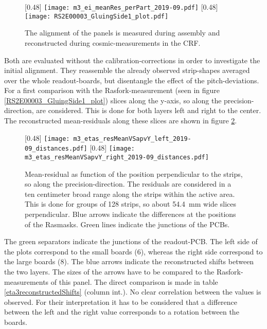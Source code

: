 \documentclass[
twoside,            %
BCOR1.4cm,          %
10pt,               %
headings=normal,    %
headsepline,        %
clearplainpage,		%
final,              %
div=14,
open=right,
bibliography=toc
]{scrreprt}
\begin{document}
\begin{figure}[!h]
	\centering
	[0.48\textwidth]
	{\texttt{[image: m3\_ei\_meanRes\_perPart\_2019-09.pdf]}}
	\hfill
	[0.48\textwidth]
	{\texttt{[image: RS2E00003\_GluingSide1\_plot.pdf]}}
	\vspace{-2mm}
	\caption{
		The alignment of the panels is measured during assembly and reconstructed during cosmic-measurements in the CRF.
	}
	\label{m3alignment}
\end{figure}

Both are evaluated without the calibration-corrections in order to investigate the initial alignment.
They reassemble the already observed strip-shapes averaged over the whole readout-boards, but disentangle the effect of the pitch-deviations.
For a first comparison with the Rasfork-measurement (seen in figure \ref{RS2E00003_GluingSide1_plot}) slices along the y-axis, so along the precision-direction, are considered.
This is done for both layers left and right to the center.
The reconstructed mean-residuals along these slices are shown in figure \ref{m3meanResidualInterior}.

\begin{figure}[!h]
	\centering
	[0.48\textwidth]
	{\texttt{[image: m3\_etas\_resMeanVSapvY\_left\_2019-09\_distances.pdf]}}
	\hfill
	[0.48\textwidth]
	{\texttt{[image: m3\_etas\_resMeanVSapvY\_right\_2019-09\_distances.pdf]}}
	\vspace{-2mm}
	\caption{
		Mean-residual as function of the position perpendicular to the strips, so along the precision-direction.
		The residuals are considered in a ten centimeter broad range along the strips within the active area.
		This is done for groups of 128 strips, so about \SI{54.4}{mm} wide slices perpendicular.
		Blue arrows indicate the differences at the positions of the Rasmasks.
		Green lines indicate the junctions of the PCBs.
	}
	\label{m3meanResidualInterior}
\end{figure}

The green separators indicate the junctions of the readout-PCB.
The left side of the plots correspond to the small boards (6), whereas the right side correspond to the large boards (8).
The blue arrows indicate the reconstructed shifts between the two layers.
The sizes of the arrows have to be compared to the Rasfork-measurements of this panel.
The direct comparison is made in table \ref{eta3reconstructedShifts} (column int.).
No clear correlation between the values is observed.
For their interpretation it has to be considered that a difference between the left and the right value corresponds to a rotation between the boards.
\end{document}
